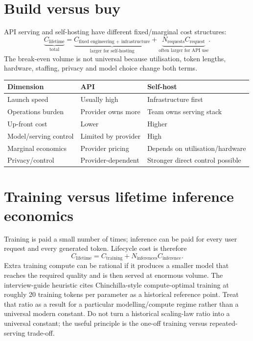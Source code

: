 \section{Build versus buy}
\label{sec:systems-build-buy}
API serving and self-hosting have different fixed/marginal cost structures:
\[
\underbrace{C_{\text{lifetime}}}_{\text{total}}
=
\underbrace{C_{\text{fixed engineering + infrastructure}}}_{\text{larger for self-hosting}}
+
\underbrace{N_{\text{requests}}C_{\text{request}}}_{\text{often larger for API use}}.
\]
The break-even volume is not universal because utilisation, token lengths, hardware, staffing, privacy and model choice change both terms.

\begin{center}
\small
\begin{tabularx}{.94\linewidth}{@{}L{.27\linewidth}YY@{}}
\toprule
\textbf{Dimension} & \textbf{API} & \textbf{Self-host} \\
\midrule
Launch speed & Usually high & Infrastructure first \\
Operations burden & Provider owns more & Team owns serving stack \\
Up-front cost & Lower & Higher \\
Model/serving control & Limited by provider & High \\
Marginal economics & Provider pricing & Depends on utilisation/hardware \\
Privacy/control & Provider-dependent & Stronger direct control possible \\
\bottomrule
\end{tabularx}
\end{center}

\section{Training versus lifetime inference economics}
\label{sec:systems-inference-economics}
Training is paid a small number of times; inference can be paid for every user request and every generated token.
Lifecycle cost is therefore
\[
\boxed{
C_{\text{lifetime}}
=
C_{\text{training}}
+
N_{\text{inferences}}
C_{\text{inference}}.
}
\]
Extra training compute can be rational if it produces a smaller model that reaches the required quality and is then served at enormous volume.
The interview-guide heuristic cites Chinchilla-style compute-optimal training at roughly 20 training tokens per parameter as a historical reference point.
Treat that ratio as a result for a particular modelling/compute regime rather than a universal modern constant.
Do not turn a historical scaling-law ratio into a universal constant; the useful principle is the one-off training versus repeated-serving trade-off.

